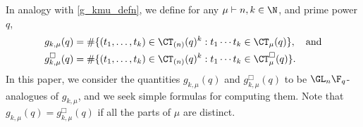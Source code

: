 In analogy with \eqref{g_kmu_defn}, we define for any \(\mu \vdash n, k \in \N\), and prime power \(q\),
\begin{align*}
g_{k,\mu} (q)
& =
\# \{ (t_1,\ldots,t_k) \in \CT_{(n)} (q)^k : t_1 \cdots t_k \in \CT_\mu (q) \}, \quad \text{and} \\
g_{k,\mu}^\Box (q)
& =
\# \{ (t_1,\ldots,t_k) \in \CT_{(n)} (q)^k : t_1 \cdots t_k \in \CT_\mu^\Box (q) \}.
\end{align*}
In this paper, we consider the quantities \(g_{k,\mu}(q)\) and \(g_{k,\mu}^\Box (q)\) to be \(\GL_n \F_q\)-analogues of \(g_{k,\mu}\),
and we seek simple formulas for computing them.
Note that \(g_{k,\mu} (q) = g_{k,\mu}^\Box (q)\) if all the parts of \(\mu\) are distinct.

